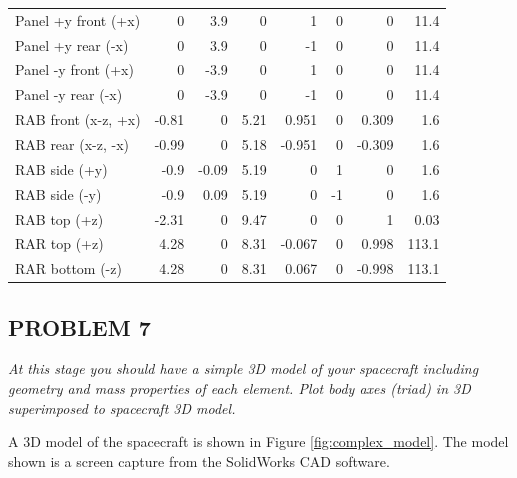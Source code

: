 \begin{longtable}{l|r|r|r|r|r|r|r}
Panel +y front (+x)            & 0     & 3.9   & 0     & 1      & 0      & 0      & 11.4  \\
Panel +y rear (-x)             & 0     & 3.9   & 0     & -1     & 0      & 0      & 11.4  \\
Panel -y front (+x)            & 0     & -3.9  & 0     & 1      & 0      & 0      & 11.4  \\
Panel -y rear (-x)             & 0     & -3.9  & 0     & -1     & 0      & 0      & 11.4  \\
RAB front (x-z, +x)            & -0.81 & 0     & 5.21  & 0.951  & 0      & 0.309  & 1.6   \\
RAB rear (x-z, -x)             & -0.99 & 0     & 5.18  & -0.951 & 0      & -0.309 & 1.6   \\
RAB side (+y)                  & -0.9  & -0.09 & 5.19  & 0      & 1      & 0      & 1.6   \\
RAB side (-y)                  & -0.9  & 0.09  & 5.19  & 0      & -1     & 0      & 1.6   \\
RAB top (+z)                   & -2.31 & 0     & 9.47  & 0      & 0      & 1      & 0.03  \\
RAR top (+z)                   & 4.28  & 0     & 8.31  & -0.067 & 0      & 0.998  & 113.1 \\
RAR bottom (-z)                & 4.28  & 0     & 8.31  & 0.067  & 0      & -0.998 & 113.1
\end{longtable}

\subsection{PROBLEM 7}
\textit{At this stage you should have a simple 3D model of your spacecraft including geometry and mass properties of each element. Plot body axes (triad) in 3D superimposed to spacecraft 3D model.}



A 3D model of the spacecraft is shown in Figure \ref{fig:complex_model}. The model shown is a screen capture from the SolidWorks CAD software.

